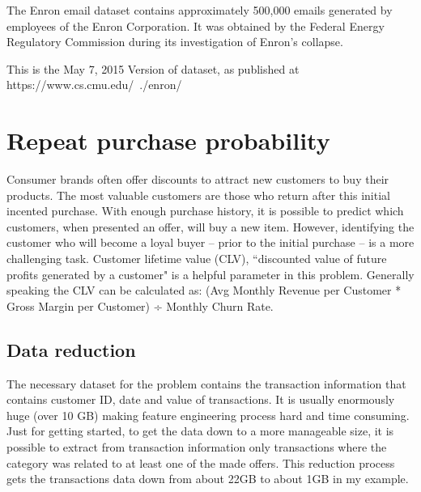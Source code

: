 \documentclass[11pt,fleqn]{book} %
\begin{document}
\begin{remark}
The Enron email dataset contains approximately 500,000 emails generated by employees of the Enron Corporation. It was obtained by the Federal Energy Regulatory Commission during its investigation of Enron's collapse.

This is the May 7, 2015 Version of dataset, as published at https://www.cs.cmu.edu/~./enron/





\chapter{Repeat purchase probability }

Consumer brands often offer discounts to attract new customers to buy their products. The most valuable customers are those who return after this initial incented purchase.  With enough purchase history, it is possible to predict which customers, when presented an offer, will buy a new item. However, identifying the customer who will become a loyal buyer -- prior to the initial purchase -- is a more challenging task.
Customer lifetime value (CLV), “discounted value of future profits generated by a customer" is a helpful parameter in this problem. Generally speaking the CLV can be calculated as: (Avg Monthly Revenue per Customer * Gross Margin per Customer) ÷ Monthly Churn Rate.

\section{Data reduction}
The necessary dataset for the problem contains the transaction information that contains customer ID, date and value of transactions. It is usually enormously huge (over 10 GB) making feature engineering process hard and time consuming. Just for getting started, to get the data down to a more manageable size, it is possible to extract from transaction information only transactions where the category was related to at least one of the made offers. This reduction process gets the transactions data down from about 22GB to about 1GB in my example. 


\end{remark}
\end{document}
